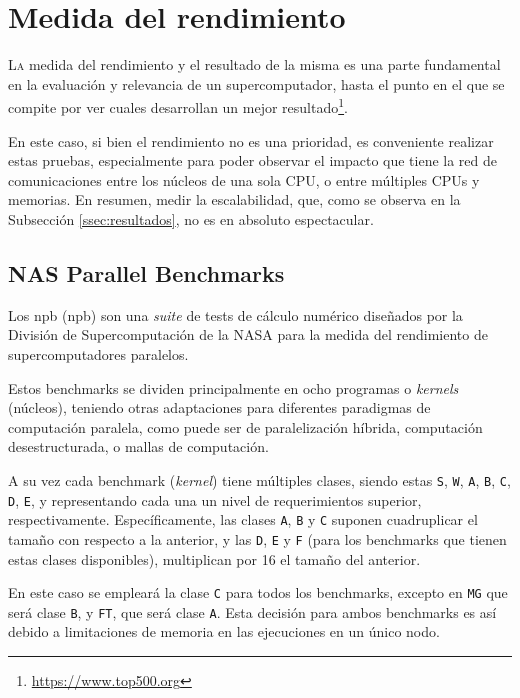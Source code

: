 \chapter{Medida del rendimiento}
\label{chap:medida_rendimiento}

\lettrine{L}{a} medida del rendimiento y el resultado de la misma es una parte fundamental en la evaluación y relevancia de un supercomputador, hasta el punto en el que se compite por ver cuales desarrollan un mejor resultado\footnote{\url{https://www.top500.org}}.

En este caso, si bien el rendimiento no es una prioridad, es conveniente realizar estas pruebas, especialmente para poder observar el impacto que tiene la red de comunicaciones entre los núcleos de una sola CPU, o entre múltiples CPUs y memorias. En resumen, medir la escalabilidad, que, como se observa en la Subsección \ref{ssec:resultados}, no es en absoluto espectacular.

\section{NAS Parallel Benchmarks}
Los \acrlong{npb} (\acrshort{npb}) \cite{npb_webpage} son una \textit{suite} de tests de cálculo numérico diseñados por la División de Supercomputación de la NASA para la medida del rendimiento de supercomputadores paralelos.

Estos benchmarks se dividen principalmente en ocho programas o \textit{kernels} (núcleos), teniendo otras adaptaciones para diferentes paradigmas de computación paralela, como puede ser de paralelización híbrida, computación desestructurada, o mallas de computación.

A su vez cada benchmark (\textit{kernel}) tiene múltiples clases, siendo estas \texttt{S}, \texttt{W}, \texttt{A}, \texttt{B}, \texttt{C}, \texttt{D}, \texttt{E}, y representando cada una un nivel de requerimientos superior, respectivamente. Específicamente, las clases \texttt{A}, \texttt{B} y \texttt{C} suponen cuadruplicar el tamaño con respecto a la anterior, y las \texttt{D}, \texttt{E} y \texttt{F} (para los benchmarks que tienen estas clases disponibles), multiplican por 16 el tamaño del anterior.

En este caso se empleará la clase \texttt{C} para todos los benchmarks, excepto en \texttt{MG} que será clase \texttt{B}, y \texttt{FT}, que será clase \texttt{A}. Esta decisión para ambos benchmarks es así debido a limitaciones de memoria en las ejecuciones en un único nodo.

